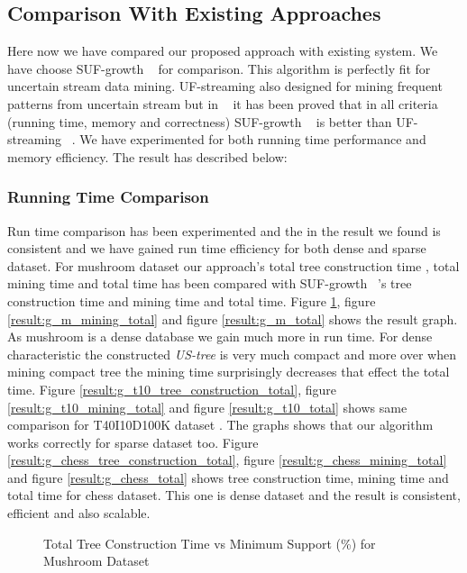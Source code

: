 \subsection{Comparison With Existing Approaches}
Here now we have compared our proposed approach with existing system. We have choose SUF-growth ~\cite{suf_growth}  for comparison. This algorithm is perfectly fit for uncertain stream data mining. UF-streaming also designed for mining frequent patterns from uncertain stream but in ~\cite{suf_growth} it has been proved that in all criteria (running time, memory and correctness) SUF-growth ~\cite{suf_growth} is better than UF-streaming ~\cite{suf_growth}. We have experimented for both running time performance and memory efficiency. The result has described below:
	\subsubsection{Running Time Comparison}
	Run time comparison has been experimented and the in the result we found is consistent and we have gained run time efficiency for both dense and sparse dataset. For mushroom dataset our approach's total tree construction time , total mining time and total time has been compared with SUF-growth ~\cite{suf_growth}'s tree construction time and mining time and total time. Figure \ref{result:g_m_tree_construction_total}, figure \ref{result:g_m_mining_total} and figure \ref{result:g_m_total} shows the result graph. As mushroom is a dense database we gain much more in run time. For dense characteristic the constructed \emph{US-tree} is very much compact and more over when mining compact tree the mining time surprisingly decreases that effect the total time. Figure \ref{result:g_t10_tree_construction_total}, figure \ref{result:g_t10_mining_total} and figure \ref{result:g_t10_total} shows same comparison for T40I10D100K dataset . The graphs shows that our algorithm works correctly for sparse dataset too. Figure \ref{result:g_chess_tree_construction_total}, figure \ref{result:g_chess_mining_total} and figure \ref{result:g_chess_total} shows tree construction time, mining time and total time for chess dataset. This one is dense dataset and the result is consistent, efficient and also scalable.
			\begin{figure}[h]
			\centering
				
			\caption{Total Tree Construction Time vs Minimum Support (\%) for Mushroom Dataset }
			\label{result:g_m_tree_construction_total}
			\end{figure}
			
